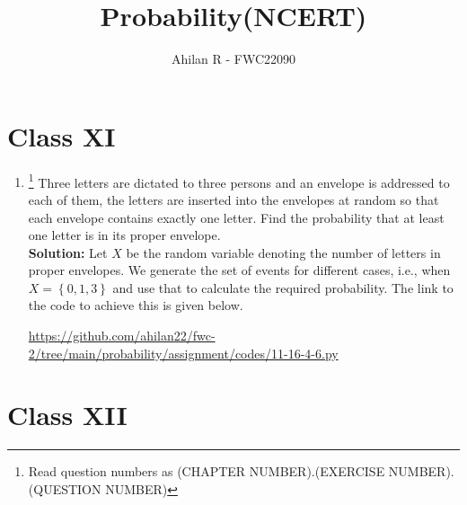 \documentclass[journal,12pt,twocolumn]{IEEEtran}
\providecommand{\cbrak}[1]{\ensuremath{\left\{#1\right\}}}
\newcommand{\solution}{\noindent \textbf{Solution: }}
\newcommand*{\permcomb}[4][0mu]{{{}^{#3}\mkern#1#2_{#4}}}
\newcommand*{\comb}[1][-1mu]{\permcomb[#1]{C}}
\newcommand\numberthis{\addtocounter{equation}{1}\tag{\theequation}}
\begin{document}
\title{Probability(NCERT)}
\author{Ahilan R - FWC22090
	}

\maketitle

\section*{Class XI}

\begin{enumerate}[label=16.\arabic{enumi}.\arabic{enumii}]%
\setcounter{enumi}{3}
\setcounter{enumii}{6}
\item \footnote{Read question numbers as (CHAPTER NUMBER).(EXERCISE NUMBER).(QUESTION NUMBER)} Three letters are dictated to three persons and an envelope is addressed to each of them, the letters are inserted into the envelopes at random so that each envelope contains exactly one letter. Find the probability that at least one letter is in its proper envelope.\\
  \solution
		Let $X$ be the random variable denoting the number of letters in proper envelopes. We generate the set of events for different cases, i.e., when $X = \cbrak{0,1,3}$ and use that to calculate the required probability. The link to the code to achieve this is given below.

\medskip
		\url{https://github.com/ahilan22/fwc-2/tree/main/probability/assignment/codes/11-16-4-6.py}
\end{enumerate}

\section*{Class XII}
\end{document}
